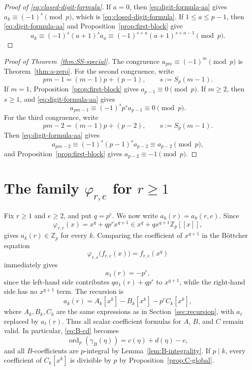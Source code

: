 \documentclass[11pt]{amsart}
\numberwithin{equation}{section}
\DeclareMathOperator{\ordop}{ord}
\newcommand{\Zp}{\mathbb{Z}_p}
\newcommand{\Sp}{S_p}
\newcommand{\vp}{\ordop_p}
\begin{document}
\begin{proof}[Proof of \eqref{eq:closed-digit-formula}]
If $a=0$, then \eqref{eq:digit-formula-aa} gives $a_k\equiv(-1)^s\pmod p$, which is \eqref{eq:closed-digit-formula}.  If $1\le a\le p-1$, then \eqref{eq:digit-formula-aa} and Proposition~\ref{prop:first-block} give
\[
        a_k\equiv (-1)^s(a+1)^sa_a
        \equiv (-1)^{s+a}(a+1)^{s+a-1}\pmod p.
\]
\end{proof}

\begin{proof}[Proof of Theorem~\ref{thm:SS-special}]
The congruence $a_{pm}\equiv(-1)^m\pmod p$ is Theorem~\ref{thm:a-zero}.  For the second congruence, write
\[
        pm-1=(m-1)p+(p-1),
        \qquad
        s:=\Sp(m-1).
\]
If $m=1$, Proposition~\ref{prop:first-block} gives $a_{p-1}\equiv0\pmod p$.  If $m\ge2$, then $s\ge1$, and \eqref{eq:digit-formula-aa} gives
\[
        a_{pm-1}\equiv(-1)^sp^sa_{p-1}\equiv0\pmod p.
\]
For the third congruence, write
\[
        pm-2=(m-1)p+(p-2),
        \qquad
        s:=\Sp(m-1).
\]
Then \eqref{eq:digit-formula-aa} gives
\[
        a_{pm-2}\equiv(-1)^s(p-1)^sa_{p-2}\equiv a_{p-2}\pmod p,
\]
and Proposition~\ref{prop:first-block} gives $a_{p-2}\equiv-1\pmod p$.
\end{proof}

\section{The family \texorpdfstring{$\varphi_{r,e}$}{phi r e} for \texorpdfstring{$r\ge1$}{r >= 1}}\label{sec:higher-recursion}
Fix $r\ge1$ and $e\ge2$, and put $q=p^e$.  We now write $a_k(r)=a_k(r,e)$.  Since
\[
        \varphi_{r,e}(x)=x^q+qp^rx^{q+1}\in x^q+qx^{q+1}\Zp[\![x]\!],
\]
\cite[Theorem~3(b)]{SalernoSilverman} gives $a_k(r)\in\Zp$ for every $k$.  Comparing the coefficient of $x^{q+1}$ in the B\"ottcher equation
\[
        \varphi_{r,e}\bigl(f_{r,e}(x)\bigr)=f_{r,e}(x^q)
\]
immediately gives
\begin{equation}\label{eq:a1-r}
        a_1(r)=-p^r,
\end{equation}
since the left-hand side contributes $q a_1(r)+q p^r$ to $x^{q+1}$, while the right-hand side has no $x^{q+1}$ term.  The recursion is
\begin{equation}\label{eq:ABC-r}
        a_k(r)=A_k[x^k]-B_k[x^k]-p^rC_k[x^k],
\end{equation}
where $A_k,B_k,C_k$ are the same expressions as in Section~\ref{sec:recursion}, with $a_\ell$ replaced by $a_\ell(r)$.  Thus all scalar coefficient formulas for $A$, $B$, and $C$ remain valid.  In particular, \eqref{eq:B-cd} becomes
\[
        \vp(\gamma_B(\eta))=c(\eta)+d(\eta)-e,
\]
and all $B$-coefficients are $p$-integral by Lemma~\ref{lem:B-integrality}.  If $p\mid k$, every coefficient of $C_k[x^k]$ is divisible by $p$ by Proposition~\ref{prop:C-global}.
\end{document}
